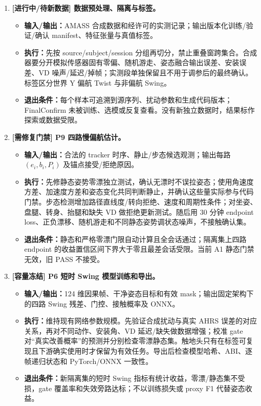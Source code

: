 \documentclass[UTF8,11pt,a4paper]{ctexart}
\begin{document}
\begin{enumerate}
  \item \textbf{[进行中/待新数据] 数据预处理、隔离与标签。}
  \begin{itemize}
    \item \textbf{输入/输出：}AMASS 合成数据和经许可的实测记录；输出版本化训练/验证/确认 manifest、特征张量与真值标签。
    \item \textbf{执行：}先按 source/subject/session 分组再切分，禁止重叠窗跨集合。合成器要分开模拟传感器固有零偏、随机游走、姿态融合输出误差、安装误差、VD 噪声/延迟/掉帧；实测段单独保留且不用于调参后的最终确认。标签区分世界 Y 偏航 Twist 与非偏航 Swing。
    \item \textbf{退出条件：}每个样本可追溯到源序列、扰动参数和生成代码版本；FinalConfirm 未被训练、选模或反复查看。没有新独立数据时，结果标作探索或数据受限。
  \end{itemize}

  \item \textbf{[需修复门禁] P9 四路慢偏航估计。}
  \begin{itemize}
    \item \textbf{输入/输出：}合法的 tracker 时序、静止/步态候选观测；输出每路 \((e_i,b_i,P_i)\) 及锚点接受/拒绝原因。
    \item \textbf{执行：}先修静态姿势零漂独立测试，确认无漂时不误拉姿态；使用角速度方差、加速度方差和姿态变化共同判断静止，并确认这些量实际参与代码门禁。步态检测增加路径直线度/转向拒绝、速度和周期性条件；对坐姿、盘腿、转身、抬腿和缺失 VD 做拒绝更新测试。随后用 30 分钟 endpoint loss、正负漂移、随机游走和不同静态姿势调状态噪声，不接触确认集。
    \item \textbf{退出条件：}静态和严格零漂门限自动计算且全会话通过；隔离集上四路 endpoint 的收益置信区间下界大于零且最差会话受限。当前 A1 静态门禁无效，旧 PASS 不接受。
  \end{itemize}

  \item \textbf{[容量冻结] P6 短时 Swing 模型训练和导出。}
  \begin{itemize}
    \item \textbf{输入/输出：}124 维因果帧、干净姿态目标和有效 mask；输出固定架构下的四路 Swing 残差、门控、接触概率及 ONNX。
    \item \textbf{执行：}维持现有网络参数规模。先验证合成扰动与真实 AHRS 误差的对应关系，再对不同动作、安装角、VD 延迟/缺失做数据增强；校准 gate 对“真实改善概率”的预测并分别检查零漂静态集。触地头只有在标签可复现且下游确实使用时才保留为有效任务。导出后检查模型哈希、ABI、逐帧递归状态和 PyTorch/ONNX 一致性。
    \item \textbf{退出条件：}新隔离集的短时 Swing 指标有统计收益，零漂/静态集不受损，gate 覆盖率和失效旁路达标；不以训练损失或 proxy F1 代替姿态收益。
  \end{itemize}


\end{enumerate}
\end{document}
